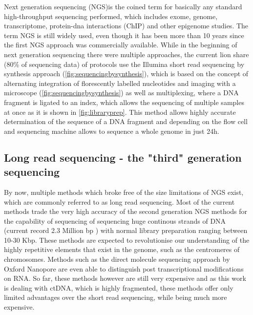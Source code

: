 Next generation sequencing (NGS)is the coined term for basically any standard high-throughput sequencing performed, which includes exome, genome, transcriptome, protein-dna interactions (ChIP) and other epigenome studies. The term NGS is still widely used, even though it has been more than 10 years since the first NGS approach was commercially available. While in the beginning of next generation sequencing there were multiple approaches, the current lion share (80\% of sequencing data) of protocols use the Illumina short read sequencing by synthesis approach (\autoref{fig:sequencingbysynthesis})\cite{Mardis2008,Straiton2019}, which is based on the concept of alternating integration of florescently labelled nucleotides and imaging with a microscope (\autoref{fig:sequencingbysynthesis}) as well as multiplexing, where a DNA fragment is ligated to an index, which allows the sequencing of multiple samples at once \cite{Church1984,Church1988} as it is shown in \autoref{fig:libraryprep}. This method allows highly accurate determination of the sequence of a DNA fragment and depending on the flow cell and sequencing machine allows to sequence a whole genome in just 24h.


\subsection[Long read sequencing]{Long read sequencing - the "third" generation sequencing}
\label{intro-sec:lrs}
By now, multiple methods which broke free of the size limitations of NGS exist, which are commonly referred to as long read sequencing. Most of the current methods trade the very high accuracy of the second generation NGS methods for the capability of sequencing of sequencing huge continous strands of DNA (current record 2.3 Million bp \cite{Payne2018}) with normal library preparation ranging between 10-30 Kbp. 
These methods are expected to revolutionise our understanding of the highly repetitive elements that exist in the genome, such as the centromeres of chromosomes. Methods such as the direct molecule sequencing approach by Oxford Nanopore are even able to distinguish post transcriptional modifications on RNA\cite{Pratanwanich2021}.
So far, these methods however are still very expensive and as this work is dealing with ctDNA, which is highly fragmented, these methods offer only limited advantages over the short read sequencing, while being much more expensive.

